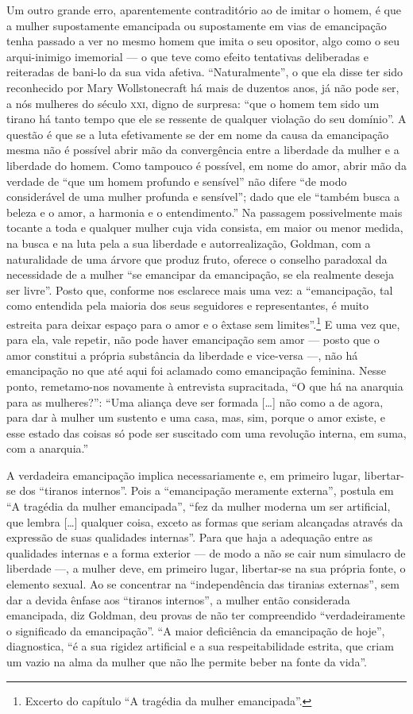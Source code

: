 Um outro grande erro, aparentemente contraditório ao de imitar o homem,
é que a mulher supostamente emancipada ou supostamente em vias de
emancipação tenha passado a ver no mesmo homem que imita o seu opositor,
algo como o seu arqui-inimigo imemorial --- o que teve como efeito
tentativas deliberadas e reiteradas de bani-lo da sua vida afetiva.
``Naturalmente'', o que ela disse ter sido reconhecido por Mary
Wollstonecraft há mais de duzentos anos, já não pode ser, a nós mulheres
do século \textsc{xxi}, digno de surpresa: ``que o homem tem sido um tirano há
tanto tempo que ele se ressente de qualquer violação do seu domínio''. A
questão é que se a luta efetivamente se der em nome da causa da
emancipação mesma não é possível abrir mão da convergência entre a
liberdade da mulher e a liberdade do homem. Como tampouco é possível, em
nome do amor, abrir mão da verdade de ``que um homem profundo e
sensível'' não difere ``de modo considerável de uma mulher profunda e
sensível''; dado que ele ``também busca a beleza e o amor, a harmonia e
o entendimento.'' Na passagem possivelmente mais tocante a toda e
qualquer mulher cuja vida consista, em maior ou menor medida, na busca e
na luta pela a sua liberdade e autorrealização, Goldman, com a
naturalidade de uma árvore que produz fruto, oferece o conselho
paradoxal da necessidade de a mulher ``se emancipar da emancipação, se
ela realmente deseja ser livre''. Posto que, conforme nos esclarece mais
uma vez: a ``emancipação, tal como entendida pela maioria dos seus
seguidores e representantes, é muito estreita para deixar espaço para o
amor e o êxtase sem limites''.\footnote{Excerto do capítulo ``A tragédia da mulher emancipada''.} E
uma vez que, para ela, vale repetir, não pode haver emancipação sem amor
--- posto que o amor constitui a própria substância da liberdade e
vice-versa ---, não há emancipação no que até aqui foi aclamado como
emancipação feminina. Nesse ponto, remetamo-nos novamente à entrevista
supracitada, ``O que há na anarquia para as mulheres?'': ``Uma aliança
deve ser formada {[}\ldots{]} não como a de agora, para dar à mulher um
sustento e uma casa, mas, sim, porque o amor existe, e esse estado das
coisas só pode ser suscitado com uma revolução interna, em suma, com a
anarquia.''

A verdadeira emancipação implica necessariamente e, em primeiro lugar,
libertar-se dos ``tiranos internos''. Pois a ``emancipação meramente
externa'', postula em ``A tragédia da mulher emancipada'', ``fez da
mulher moderna um ser artificial, que lembra {[}\ldots{]} qualquer coisa,
exceto as formas que seriam alcançadas através da expressão de suas
qualidades internas''. Para que haja a adequação entre as qualidades
internas e a forma exterior --- de modo a não se cair num simulacro de
liberdade ---, a mulher deve, em primeiro lugar, libertar-se na sua
própria fonte, o elemento sexual. Ao se concentrar na ``independência
das tiranias externas'', sem dar a devida ênfase aos ``tiranos
internos'', a mulher então considerada emancipada, diz Goldman, deu
provas de não ter compreendido ``verdadeiramente o significado da
emancipação''. ``A maior deficiência da emancipação de hoje'',
diagnostica, ``é a sua rigidez artificial e a sua respeitabilidade
estrita, que criam um vazio na alma da mulher que não lhe permite beber
na fonte da vida''.

